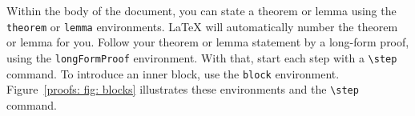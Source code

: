 Within the body of the document, you can state a theorem or lemma using the \texttt{theorem} or
\texttt{lemma} environments. %
LaTeX will automatically number the theorem or lemma for you.
Follow your theorem or lemma statement by a long-form proof, using the \texttt{longFormProof} environment.
With that, start each step with a \texttt{\textbackslash step} command. %
%
To introduce an inner block, use the \texttt{block} environment. %
Figure~\ref{proofs: fig: blocks} illustrates these environments and the \texttt{\textbackslash step} command.
%
